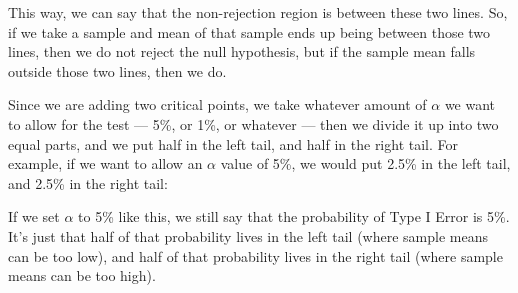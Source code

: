 \documentclass[../../../main.tex]{subfiles}
\begin{document}
\noindent
This way, we can say that the non-rejection region is between these two lines. So, if we take a sample and mean of that sample ends up being between those two lines, then we do not reject the null hypothesis, but if the sample mean falls outside those two lines, then we do.

Since we are adding two critical points, we take whatever amount of $\alpha$ we want to allow for the test --- 5\%, or 1\%, or whatever --- then we divide it up into two equal parts, and we put half in the left tail, and half in the right tail. For example, if we want to allow an $\alpha$ value of 5\%, we would put 2.5\% in the left tail, and 2.5\% in the right tail:

\begin{center}
\end{center}

\noindent
If we set $\alpha$ to 5\% like this, we still say that the probability of Type I Error is 5\%. It's just that half of that probability lives in the left tail (where sample means can be too low), and half of that probability lives in the right tail (where sample means can be too high).
\end{document}
